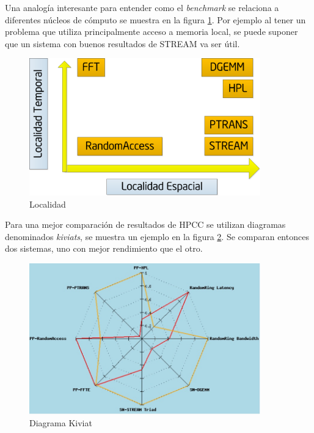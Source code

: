 \documentclass[a4paper]{report}
\begin{document}
\bigskip

Una analogía interesante para entender como el {\it benchmark} se relaciona a diferentes núcleos de cómputo
se muestra en la figura \ref{fig:locality}. Por ejemplo al tener un problema que
utiliza principalmente acceso a memoria local, se puede suponer que un sistema con
buenos resultados de STREAM va ser útil.

\bigskip

\begin{figure}[H]
\begin{center}
\includegraphics[width=10cm]{locality.png}
\caption{Localidad}
\label{fig:locality}
\end{center}
\end{figure}

\bigskip

Para una mejor comparación de resultados de HPCC se utilizan diagramas
denominados {\it kiviats}, se muestra un ejemplo en la figura \ref{fig:kiviat}.
Se comparan entonces dos sistemas, uno con mejor rendimiento que el otro.

\begin{figure}[H]
\begin{center}
\includegraphics[width=10cm]{kiviat.png}
\caption{Diagrama Kiviat}
\label{fig:kiviat}
\end{center}
\end{figure}
\end{document}
